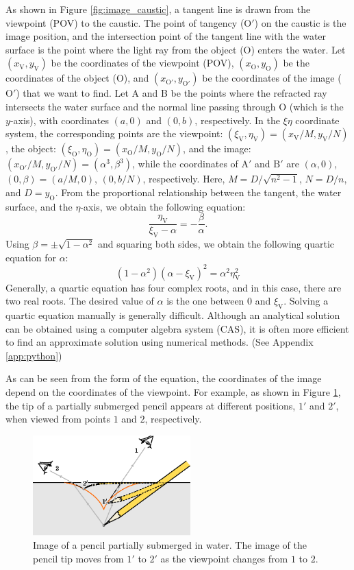 \documentclass[twocolumn]{article}
\begin{document}
As shown in Figure \ref{fig:image_caustic}, a tangent line is drawn from the viewpoint (POV) to the caustic. The point of tangency ($\mathrm{O'}$) on the caustic is the image position, and the intersection point of the tangent line with the water surface is the point where the light ray from the object ($\mathrm{O}$) enters the water.
Let $(x_{\mathrm{V}}, y_{\mathrm{V}})$ be the coordinates of the viewpoint (POV), $(x_{\mathrm{O}}, y_{\mathrm{O}})$ be the coordinates of the object ($\mathrm{O}$), and $(x_{\mathrm{O'}}, y_{\mathrm{O'}})$ be the coordinates of the image ($\mathrm{O'}$) that we want to find. Let A and B be the points where the refracted ray intersects the water surface and the normal line passing through O (which is the $y$-axis), with coordinates $(a, 0)$ and $(0, b)$, respectively. In the $\xi\eta$ coordinate system, the corresponding points are the viewpoint: $(\xi_{\mathrm{V}}, \eta_{\mathrm{V}})=(x_{\mathrm{V}}/M, y_{\mathrm{V}}/N)$, the object: $(\xi_{\mathrm{O}}, \eta_{\mathrm{O}})=(x_{\mathrm{O}}/M, y_{\mathrm{O}}/N)$, and the image: $(x_{\mathrm{O'}}/M, y_{\mathrm{O'}}/N)=(\alpha^3, \beta^3)$, while the coordinates of $\mathrm{A'}$ and $\mathrm{B'}$ are $(\alpha, 0)$, $(0, \beta)=(a/M, 0)$, $(0, b/N)$, respectively. Here, $M=D/\sqrt{n^2-1}$, $N=D/n$, and $D=y_{\mathrm{O}}$. From the proportional relationship between the tangent, the water surface, and the $\eta$-axis, we obtain the following equation:
$$\dfrac{\eta_{\mathrm{V}}}{\xi_{\mathrm{V}}-\alpha}=-\dfrac{\beta}{\alpha}.$$
Using $\beta = \pm \sqrt{1-\alpha^2}$ and squaring both sides, we obtain the following quartic equation for $\alpha$:
\[
\left( 1 - \alpha^2 \right) \left(\alpha-\xi_{\mathrm{V}} \right)^2 = \alpha^2 \eta_{\mathrm{V}}^2
\]
Generally, a quartic equation has four complex roots, and in this case, there are two real roots. The desired value of $\alpha$ is the one between 0 and $\xi_{\mathrm{V}}$. Solving a quartic equation manually is generally difficult. Although an analytical solution can be obtained using a computer algebra system (CAS), it is often more efficient to find an approximate solution using numerical methods. (See Appendix \ref{app:python})

As can be seen from the form of the equation, the coordinates of the image depend on the coordinates of the viewpoint. For example, as shown in Figure \ref{fig:pencil_view}, the tip of a partially submerged pencil appears at different positions, $1'$ and $2'$, when viewed from points $1$ and $2$, respectively.

\begin{figure}[h]
	\centering
	\includegraphics[width=2.4in]{figs/g43.eps}
	\caption{Image of a pencil partially submerged in water. The image of the pencil tip moves from $1'$ to $2'$ as the viewpoint changes from $1$ to $2$.}
	\label{fig:pencil_view}
\end{figure}
\end{document}
